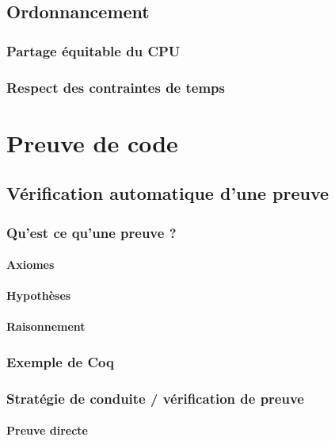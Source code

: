 		\subsection{Ordonnancement}

			\subsubsection{Partage équitable du CPU}

			\subsubsection{Respect des contraintes de temps}

	\section{Preuve de code}

		\subsection{Vérification automatique d'une preuve}

			\subsubsection{Qu'est ce qu'une preuve ?}

				\paragraph{Axiomes}
				\paragraph{Hypothèses}
				\paragraph{Raisonnement}

			\subsubsection{Exemple de Coq}

			\subsubsection{Stratégie de conduite / vérification de preuve}

				\paragraph{Preuve directe}
